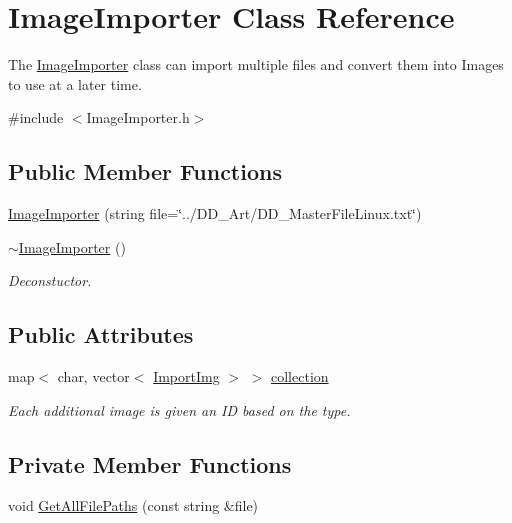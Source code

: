 \hypertarget{classImageImporter}{\section{Image\-Importer Class Reference}
\label{classImageImporter}
}


The \hyperlink{classImageImporter}{Image\-Importer} class can import multiple files and convert them into Images to use at a later time.  




{\ttfamily \#include $<$Image\-Importer.\-h$>$}

\subsection*{Public Member Functions}
\begin{DoxyCompactItemize}
\item 
\hyperlink{classImageImporter_ad6e4c552d18221322f2d30e9ee2fb695}{Image\-Importer} (string file=\char`\"{}../D\-D\-\_\-\-Art/D\-D\-\_\-\-Master\-File\-Linux.\-txt\char`\"{})
\item 
\hyperlink{classImageImporter_aeb07a2a5d1af993e336ff5bd84217b0c}{$\sim$\-Image\-Importer} ()
\begin{DoxyCompactList}\small\item\em Deconstuctor. \end{DoxyCompactList}\end{DoxyCompactItemize}
\subsection*{Public Attributes}
\begin{DoxyCompactItemize}
\item 
map$<$ char, vector$<$ \hyperlink{classImportImg}{Import\-Img} $>$ $>$ \hyperlink{classImageImporter_a8f0b778e6af2bd36dcda7a35107e4a18}{collection}
\begin{DoxyCompactList}\small\item\em Each additional image is given an I\-D based on the type. \end{DoxyCompactList}\end{DoxyCompactItemize}
\subsection*{Private Member Functions}
\begin{DoxyCompactItemize}
\item 
void \hyperlink{classImageImporter_aed1380088ef265b97ef0aa680ed151f0}{Get\-All\-File\-Paths} (const string \&file)
\end{DoxyCompactItemize}
